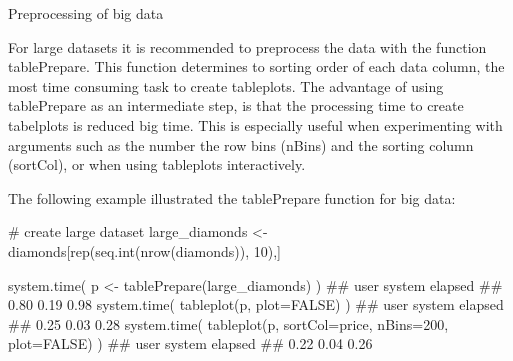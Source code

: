 \begin{frame}


Preprocessing of big data

For large datasets it is recommended to preprocess the data with the function tablePrepare. This function determines to sorting order of each data column, the most time consuming task to create tableplots. The advantage of using tablePrepare as an intermediate step, is that the processing time to create tabelplots is reduced big time. This is especially useful when experimenting with arguments such as the number the row bins (nBins) and the sorting column (sortCol), or when using tableplots interactively.

The following example illustrated the tablePrepare function for big data:

# create large dataset
large_diamonds <- diamonds[rep(seq.int(nrow(diamonds)), 10),]

system.time({
    p <- tablePrepare(large_diamonds)
})
##    user  system elapsed 
##    0.80    0.19    0.98
system.time({
    tableplot(p, plot=FALSE)
})
##    user  system elapsed 
##    0.25    0.03    0.28
system.time({
    tableplot(p, sortCol=price, nBins=200, plot=FALSE)
})
##    user  system elapsed 
##    0.22    0.04    0.26


\end{frame}
